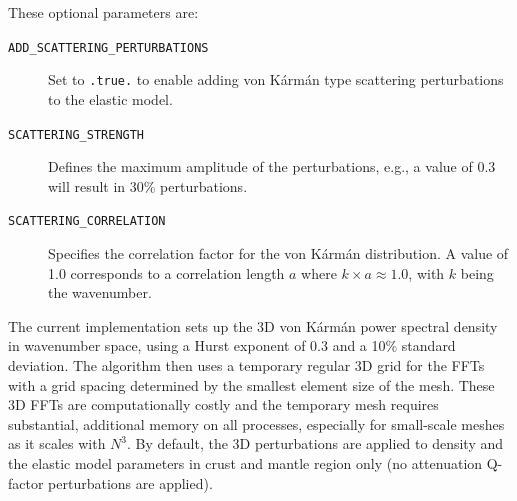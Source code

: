 These optional parameters are:
\begin{description}
\item [{\texttt{ADD\_SCATTERING\_PERTURBATIONS}}] Set to \texttt{.true.} to enable adding von K\'arm\'an type scattering perturbations to the elastic model.
\item [{\texttt{SCATTERING\_STRENGTH}}] Defines the maximum amplitude of the perturbations, e.g., a value of 0.3 will result in 30\% perturbations.
\item [{\texttt{SCATTERING\_CORRELATION}}] Specifies the correlation factor for the von K\'arm\'an distribution. A value of 1.0 corresponds to a correlation length $a$ where $k \times a \approx 1.0$, with $k$ being the wavenumber.
\end{description}

The current implementation sets up the 3D von K\'arm\'an power spectral density in wavenumber space, using a Hurst exponent of 0.3 and a 10\% standard deviation. The algorithm then uses a temporary regular 3D grid for the FFTs with a grid spacing determined by the smallest element size of the mesh. These 3D FFTs are computationally costly and the temporary mesh requires substantial, additional memory on all processes, especially for small-scale meshes as it scales with $N^3$. By default, the 3D perturbations are applied to density and the elastic model parameters in crust and mantle region only (no attenuation Q-factor perturbations are applied).


